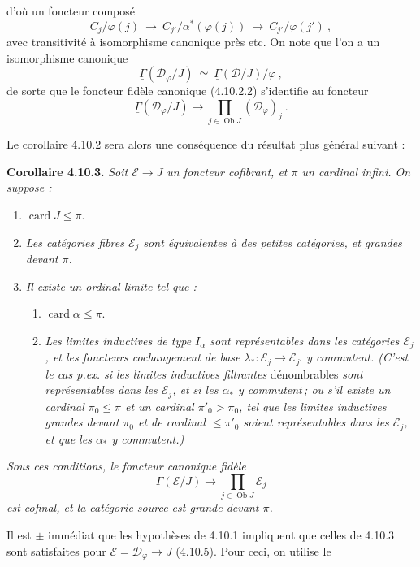 \documentclass[11pt]{article}
\newcommand{\printedpage}[1]{\marginpar{\footnotesize p.~#1}}
\newcommand{\msp}[1]{\marginpar{\footnotesize [#1]}}
\newcommand{\uGamma}{\underline{\Gamma}}
\newcommand{\Ob}{\operatorname{Ob}}
\newcommand{\card}{\operatorname{card}}
\begin{document}
\printedpage{93}

\msp{page 247}
d'où un foncteur composé
\[
C_j/\varphi(j) \ \longrightarrow \ C_{j'}/\alpha^*(\varphi(j)) \ \longrightarrow \ C_{j'}/\varphi(j') \ ,
\]
avec transitivité à isomorphisme canonique près etc. On note que l'on a un isomorphisme canonique
\[
\uGamma(\mathcal{D}_\varphi/J) \ \simeq \ \uGamma(\mathcal{D}/J)/\varphi \ ,
\]
de sorte que le foncteur fidèle canonique (4.10.2.2) s'identifie au foncteur
\[
\uGamma(\mathcal{D}_\varphi/J) \longrightarrow \prod_{j\in\Ob J} (\mathcal{D}_\varphi)_j \ . \tag*{(4.10.6)}
\]

Le corollaire 4.10.2 sera alors une conséquence du résultat plus général suivant :

\textbf{Corollaire 4.10.3.} \textit{Soit $\mathcal{E} \longrightarrow J$ un foncteur cofibrant, et $\pi$ un cardinal infini. On suppose :}
\begin{enumerate}[label={}, leftmargin=3em]
\item[\textit{a)}] $\card J \leqslant \pi$.
\item[\textit{b)}] \textit{Les catégories fibres $\mathcal{E}_j$ sont équivalentes à des petites catégories, et grandes devant $\pi$.}
\item[\textit{c)}] \textit{Il existe un ordinal limite tel que :}
\begin{enumerate}[label={}, leftmargin=3em]
\item[\textit{1°)}] $\card \alpha \leqslant \pi$.
\item[\textit{2°)}] \msp{page 248}\textit{Les limites inductives de type $I_\alpha$ sont représentables dans les catégories $\mathcal{E}_j$, et les foncteurs cochangement de base $\lambda_* : \mathcal{E}_j \longrightarrow \mathcal{E}_{j'}$ y commutent. (C'est le cas p.ex. si les limites inductives filtrantes} dénombrables \textit{sont représentables dans les $\mathcal{E}_j$, et si les $\alpha_*$ y commutent\,; ou s'il existe un cardinal $\pi_0 \leqslant \pi$ et un cardinal $\pi'_0 > \pi_0$, tel que les limites inductives grandes devant $\pi_0$ et de cardinal $\leqslant \pi'_0$ soient représentables dans les $\mathcal{E}_j$, et que les $\alpha_*$ y commutent.)}
\end{enumerate}
\end{enumerate}
\textit{Sous ces conditions, le foncteur canonique fidèle}
\[
\uGamma(\mathcal{E}/J) \longrightarrow \prod_{j\in\Ob J} \mathcal{E}_j \tag*{(4.10.3.1)}
\]
\textit{est cofinal, et la catégorie source est grande devant $\pi$.}

Il est $\pm$ immédiat que les hypothèses de 4.10.1 impliquent que celles de 4.10.3 sont satisfaites pour $\mathcal{E} = \mathcal{D}_\varphi \longrightarrow J$ (4.10.5). Pour
\msp{page 249}
ceci, on utilise le
\end{document}
